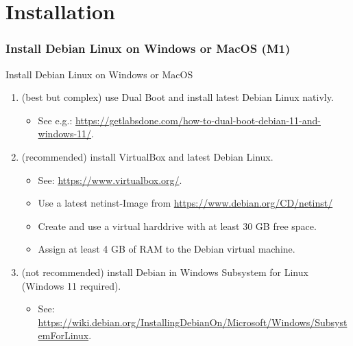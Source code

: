 
\part[withpartpage]{Installation}
\nosectionpage
\section{Install Debian Linux on Windows or MacOS (M1)}
\withsectionpage

\begin{frame}{Install Debian Linux on Windows or MacOS}
  \begin{enumerate}
    \item[Either] (best but complex) use \alert{Dual Boot} and install \alert{latest Debian} Linux \alert{nativly}.
    \begin{itemize}
      \item See e.g.: \alert{\href{https://getlabsdone.com/how-to-dual-boot-debian-11-and-windows-11/}{https://getlabsdone.com/how-to-dual-boot-debian-11-and-windows-11/}}.
    \end{itemize}
    \item[Or] (recommended) install \alert{VirtualBox} and \alert{latest Debian} Linux.
    \begin{itemize}
      \item See: \alert{\href{https://www.virtualbox.org/}{https://www.virtualbox.org/}}.
      \item Use a latest \alert{netinst-Image} from \alert{\href{https://www.debian.org/CD/netinst/}{https://www.debian.org/CD/netinst/}}
      \item Create and use a virtual harddrive with at least \alert{30 GB} free space.
      \item Assign at least \alert{4 GB} of \alert{RAM} to the \alert{Debian virtual machine}.
    \end{itemize}
    \item[Or] (not recommended) install Debian in Windows Subsystem for Linux (Windows 11 required).
    \begin{itemize}
      \item See: \alert{\href{https://wiki.debian.org/InstallingDebianOn/Microsoft/Windows/SubsystemForLinux}{https://wiki.debian.org/InstallingDebianOn/Microsoft/Windows/SubsystemForLinux}}.
    \end{itemize}

\end{enumerate}
\end{frame}
